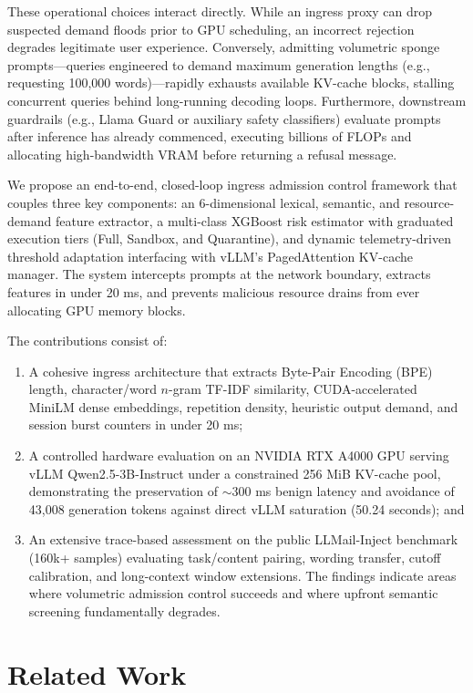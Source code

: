 \documentclass[runningheads]{article}
\begin{document}
These operational choices interact directly. While an ingress proxy can drop suspected demand floods prior to GPU scheduling, an incorrect rejection degrades legitimate user experience. Conversely, admitting volumetric sponge prompts—queries engineered to demand maximum generation lengths (e.g., requesting 100,000 words)—rapidly exhausts available KV-cache blocks, stalling concurrent queries behind long-running decoding loops. Furthermore, downstream guardrails (e.g., Llama Guard or auxiliary safety classifiers) evaluate prompts after inference has already commenced, executing billions of FLOPs and allocating high-bandwidth VRAM before returning a refusal message.

We propose an end-to-end, closed-loop ingress admission control framework that couples three key components: an 6-dimensional lexical, semantic, and resource-demand feature extractor, a multi-class XGBoost risk estimator with graduated execution tiers (Full, Sandbox, and Quarantine), and dynamic telemetry-driven threshold adaptation interfacing with vLLM's PagedAttention KV-cache manager. The system intercepts prompts at the network boundary, extracts features in under 20 ms, and prevents malicious resource drains from ever allocating GPU memory blocks.

The contributions consist of:
\begin{enumerate}
    \item[(i)] A cohesive ingress architecture that extracts Byte-Pair Encoding (BPE) length, character/word $n$-gram TF-IDF similarity, CUDA-accelerated MiniLM dense embeddings, repetition density, heuristic output demand, and session burst counters in under 20 ms;
    \item[(ii)] A controlled hardware evaluation on an NVIDIA RTX A4000 GPU serving vLLM Qwen2.5-3B-Instruct under a constrained 256 MiB KV-cache pool, demonstrating the preservation of $\sim$300 ms benign latency and avoidance of 43,008 generation tokens against direct vLLM saturation (50.24 seconds); and
    \item[(iii)] An extensive trace-based assessment on the public LLMail-Inject benchmark (160k+ samples) evaluating task/content pairing, wording transfer, cutoff calibration, and long-context window extensions. The findings indicate areas where volumetric admission control succeeds and where upfront semantic screening fundamentally degrades.
\end{enumerate}

\section{Related Work}
\end{document}
